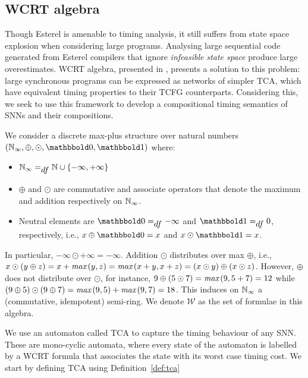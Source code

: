 \subsection{\ac{WCRT} algebra}
\label{sec:wcrt-algebra}

Though Esterel is amenable to timing analysis, it still suffers from state space explosion when considering large programs. 
Analysing large sequential code generated from Esterel compilers that ignore \emph{infeasible state space} 
produce large overestimates. \ac{WCRT} algebra, presented in \cite{wang2017timing}, presents a solution to this problem: large synchronous programs can be expressed as 
networks of simpler \ac{TCA}, which have equivalent timing properties to their \ac{TCFG} counterparts. Considering this, we
seek to use this framework to develop a compositional timing semantics of \acp{SNN} and their compositions.

We consider a discrete max-plus structure over
natural numbers $(\Nat_{\infty}, \oplus, \odot, \zero, \one)$ where:
\begin{itemize}
	\item ${\mathbb N}_{\infty} =_{\textstyle{df}} {\mathbb N} \cup \{ -\infty, +\infty \}$
	\item  $\oplus$ and $\odot$ are commutative and associate operators that 
	denote the maximum and addition respectively on ${\mathbb N}_{\infty}$. 
	\item Neutral elements are $\zero \dfs -\infty$ and $\one \dfs 0$,
	respectively, i.e., $x \oplus \zero = x$ and $x \odot \one = x$. 
\end{itemize}

In particular, $-\infty \odot +\infty = -\infty$. Addition
$\odot$ distributes over max $\oplus$, i.e.,
$x \odot \left(y \oplus z\right) = x + \textit{max}\left(y, z\right) = \textit{max}\left(x + y, x + z\right) =
\left(x \odot y\right) \oplus \left(x \odot z\right)$. However, $\oplus$ does not distribute
over $\odot$, for instance, $9 \oplus \left(5 \odot 7\right) = \textit{max}\left(9, 5 + 7\right) = 12$
while $\left(9 \oplus 5\right) \odot \left(9 \oplus 7\right) = \textit{max}\left(9, 5\right) + \textit{max}\left(9, 7\right) = 18$.
This induces on ${\mathbb N}_{\infty}$ a (commutative, idempotent) semi-ring.
We denote $\mathcal{W}$ as the set of formulae in this algebra.

We use an automaton called \ac{TCA} to capture the timing behaviour of any \ac{SNN}.
These are mono-cyclic automata, where every state of the automaton is labelled by a
WCRT formula that associates the state with its worst case timing cost.
We start by defining \ac{TCA} using Definition~\ref{def:tca}

